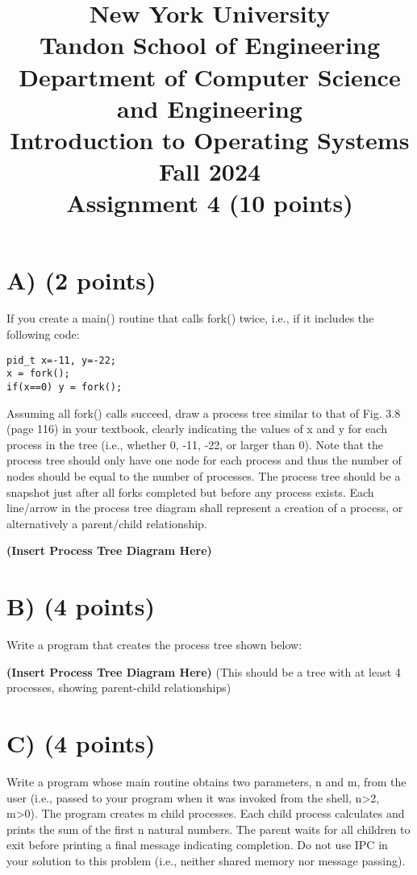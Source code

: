 \documentclass{article}
\title{New York University \\ Tandon School of Engineering \\ Department of Computer Science and Engineering \\ Introduction to Operating Systems \\ Fall 2024 \\ Assignment 4 (10 points)}
\author{}
\date{}
\begin{document}
\maketitle

\section*{A) (2 points)}

If you create a main() routine that calls fork() twice, i.e., if it includes the following code:

\begin{verbatim}
pid_t x=-11, y=-22;
x = fork();
if(x==0) y = fork();
\end{verbatim}

Assuming all fork() calls succeed, draw a process tree similar to that of Fig. 3.8 (page 116) in your textbook, clearly indicating the values of x and y for each process in the tree (i.e., whether 0, -11, -22, or larger than 0).  Note that the process tree should only have one node for each process and thus the number of nodes should be equal to the number of processes. The process tree should be a snapshot just after all forks completed but before any process exists. Each line/arrow in the process tree diagram shall represent a creation of a process, or alternatively a parent/child relationship.

\textbf{(Insert Process Tree Diagram Here)}



\section*{B) (4 points)}

Write a program that creates the process tree shown below:

\textbf{(Insert Process Tree Diagram Here)}  (This should be a tree with at least 4 processes, showing parent-child relationships)




\section*{C) (4 points)}

Write a program whose main routine obtains two parameters, n and m, from the user (i.e., passed to your program when it was invoked from the shell, n>2, m>0). The program creates m child processes. Each child process calculates and prints the sum of the first n natural numbers. The parent waits for all children to exit before printing a final message indicating completion.  Do not use IPC in your solution to this problem (i.e., neither shared memory nor message passing).
\end{document}
